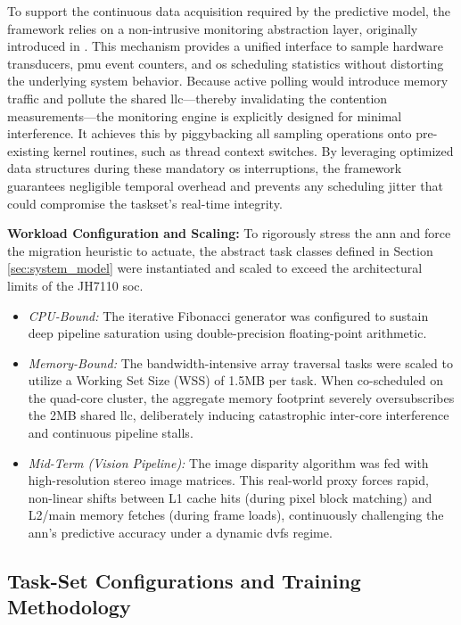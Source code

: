 \documentclass[conference]{IEEEtran}
\begin{document}
To support the continuous data acquisition required by the predictive model, the framework relies on a non-intrusive monitoring abstraction layer, originally introduced in \cite{Horstmann:ETFA:2019}. This mechanism provides a unified interface to sample hardware transducers, \gls{pmu} event counters, and \gls{os} scheduling statistics without distorting the underlying system behavior. Because active polling would introduce memory traffic and pollute the shared \gls{llc}---thereby invalidating the contention measurements---the monitoring engine is explicitly designed for minimal interference. It achieves this by piggybacking all sampling operations onto pre-existing kernel routines, such as thread context switches. By leveraging optimized data structures during these mandatory \gls{os} interruptions, the framework guarantees negligible temporal overhead and prevents any scheduling jitter that could compromise the taskset's real-time integrity.

\textbf{Workload Configuration and Scaling:} To rigorously stress the \gls{ann} and force the migration heuristic to actuate, the abstract task classes defined in Section \ref{sec:system_model} were instantiated and scaled to exceed the architectural limits of the JH7110 \gls{soc}. 
\begin{itemize}
    \item \textit{CPU-Bound:} The iterative Fibonacci generator was configured to sustain deep pipeline saturation using double-precision floating-point arithmetic.
    \item \textit{Memory-Bound:} The bandwidth-intensive array traversal tasks were scaled to utilize a Working Set Size (WSS) of 1.5MB per task. When co-scheduled on the quad-core cluster, the aggregate memory footprint severely oversubscribes the 2MB shared \gls{llc}, deliberately inducing catastrophic inter-core interference and continuous pipeline stalls.
    \item \textit{Mid-Term (Vision Pipeline):} The image disparity algorithm was fed with high-resolution stereo image matrices. This real-world proxy forces rapid, non-linear shifts between L1 cache hits (during pixel block matching) and L2/main memory fetches (during frame loads), continuously challenging the \gls{ann}'s predictive accuracy under a dynamic \gls{dvfs} regime.
\end{itemize}

\subsection{Task-Set Configurations and Training Methodology}
\label{sec:tasksets}
\end{document}
